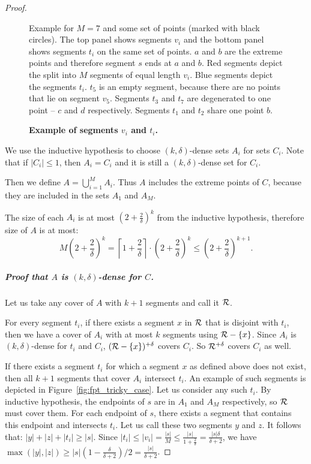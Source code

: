\begin{proof}
\begin{figure}[h]
\begin{center}
\def\svgwidth{\columnwidth}

\end{center}
\caption{\textbf{Example of segments $v_i$ and $t_i$.}}
Example for $M = 7$ and some set of points (marked with black circles).
The top panel shows segments $v_i$ and the bottom panel shows segments $t_i$
on the same set of points.
$a$ and $b$ are the extreme points and therefore segment $s$
ends at $a$ and $b$.
Red segments depict the split into $M$ segments of equal length $v_i$.
Blue segments depict the segments $t_i$. $t_5$ is an empty segment,
because there are no points that lie on segment $v_5$.
Segments $t_3$ and $t_7$ are degenerated to one point --
$c$ and $d$ respectively.
Segments $t_1$ and $t_2$ share one point $b$.
\label{fig:fpt_v_f_def}
\end{figure}

We use the inductive hypothesis to choose $(k, \delta)$-dense sets $A_i$
for sets $C_i$. Note that if $|C_i| \le 1$, then $A_i = C_i$
and it is still a $(k, \delta)$-dense set for $C_i$.

Then we define $A = \bigcup_{i=1}^{M} A_i$.
Thus $A$ includes the extreme points of $C$,
because they are included in the sets $A_1$ and $A_M$.

The size of each $A_i$ is at most $(2+\frac{2}{\delta})^{k}$
from the inductive hypothesis, therefore size of $A$ is at most:
$$M\left(2+\frac{2}{\delta}\right)^{k} =
\left\lceil1+\frac{2}{\delta}\right\rceil\cdot\left(2+\frac{2}{\delta}\right)^{k}
\le \left(2+\frac{2}{\delta}\right)^{k+1}.$$


\subparagraph{Proof that $A$ is $(k, \delta)$-dense for $C$.}
Let us take any cover of $A$ with $k+1$ segments and call it $\mathcal{R}$.

For every segment $t_i$, if there exists a segment $x$ in $\mathcal{R}$ 
that is disjoint with $t_i$,
then we have a cover of $A_i$ with at most $k$
segments using $\mathcal{R} - \{x\}$.
Since $A_i$ is $(k, \delta)$-dense for $t_i$ and $C_i$,
$(\mathcal{R} - \{x\})^{+\delta}$ covers $C_i$.
So $\mathcal{R}^{+\delta}$ covers $C_i$ as well.

If there exists a segment $t_i$ for which a segment $x$ as defined above
does not exist, then all $k+1$ segments that cover
$A_i$ intersect $t_i$.
An example of such segments is depicted in Figure~\ref{fig:fpt_tricky_case}.
Let us consider any such $t_i$.
By inductive hypothesis, the endpoints of $s$ are
in $A_1$ and $A_M$ respectively, so $\mathcal{R}$ must cover them.
For each endpoint of $s$, there exists
a segment that contains this endpoint and intersects $t_i$.
Let us call these two segments $y$ and $z$. It follows that:
$|y| + |z| + |t_i| \ge |s|$.
Since $|t_i| \le |v_i| = \frac{|s|}{M} \le \frac{|s|}{1+\frac{2}{\delta}} = \frac{|s|\delta}{\delta+2}$,
we have $\max(|y|, |z|) \ge |s|(1-\frac{\delta}{\delta+2})/2 = \frac{|s|}{\delta+2}$.


\end{proof}
